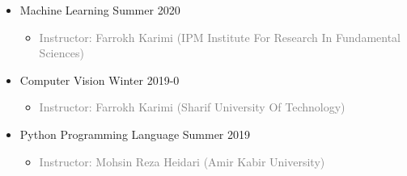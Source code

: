\documentclass[10pt,a4paper,sans]{moderncv} %
\begin{document}
\begin{itemize}
\begin{itemize}
			\item {} Machine Learning \hfill Summer 2020
			\begin{itemize}
				\item\textcolor{gray}{Instructor: Farrokh Karimi (IPM Institute For Research In Fundamental Sciences)}
			\end{itemize}

            \item {} Computer Vision \hfill Winter 2019-0
			\begin{itemize}
				\item\textcolor{gray}{Instructor: Farrokh Karimi (Sharif University Of Technology)}
			\end{itemize}

			\item {} Python Programming Language \hfill Summer 2019
			\begin{itemize}
				\item\textcolor{gray}{Instructor: Mohsin Reza Heidari (Amir Kabir University)}
				\newline
			\end{itemize}
			
		\end{itemize}
	\end{itemize}
	
	
\end{document}
